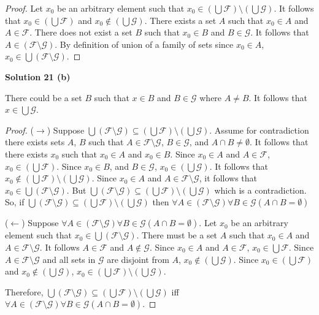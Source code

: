 \begin{proof}
    Let $x_0$ be an arbitrary element such that $x_0 \in (\bigcup \mathcal{F}) \setminus (\bigcup \mathcal{G})$.
    It follows that $x_0 \in (\bigcup \mathcal{F})$ and $x_0 \not \in (\bigcup \mathcal{G})$.
    There exists a set $A$ such that $x_0 \in A$ and $A \in \mathcal{F}$.
    There does not exist a set $B$ such that $x_0 \in B$ and $B \in \mathcal{G}$.
    It follows that $A \in (\mathcal{F} \setminus \mathcal{G})$.
    By definition of union of a family of sets since $x_0 \in A$, $x_0 \in \bigcup (\mathcal{F} \setminus \mathcal{G})$.
\end{proof}

\textbf{Solution 21 (b)}

There could be a set $B$ such that $x \in B$ and $B \in \mathcal{G}$ where $A
    \not = B$. It follows that $x \in \bigcup \mathcal{G}$.

\begin{proof}
    ($\rightarrow$) Suppose $\bigcup (\mathcal{F} \setminus \mathcal{G})
        \subseteq (\bigcup \mathcal{F}) \setminus (\bigcup \mathcal{G})$.
    Assume for contradiction there exists sets $A$, $B$ such that $A \in \mathcal{F} \setminus \mathcal{G}$, 
    $B \in \mathcal{G}$, and $A \cap B \not = \emptyset$.
    It follows that there exists $x_0$ such that $x_0 \in A$ and $x_0 \in B$.
    Since $x_0 \in A$ and $A \in \mathcal{F}$, $x_0 \in (\bigcup \mathcal{F})$.
    Since $x_0 \in B$, and $B \in \mathcal{G}$, $x_0 \in (\bigcup\mathcal{G})$.
    It follows that $x_0 \not \in (\bigcup \mathcal{F}) \setminus(\bigcup \mathcal{G})$.
    Since $x_0 \in A$ and $A \in \mathcal{F} \setminus \mathcal{G}$, 
    it follows that $x_0 \in \bigcup (\mathcal{F} \setminus \mathcal{G})$.
    But $\bigcup (\mathcal{F} \setminus \mathcal{G})
        \subseteq (\bigcup \mathcal{F}) \setminus (\bigcup \mathcal{G})$
    which is a contradiction.
    So, if $\bigcup (\mathcal{F} \setminus \mathcal{G})
        \subseteq (\bigcup \mathcal{F}) \setminus (\bigcup \mathcal{G})$
    then $\forall{A} \in (\mathcal{F} \setminus \mathcal{G})\forall{B}
        \in \mathcal{G}(A \cap B = \emptyset)$

    ($\leftarrow$) Suppose $\forall{A} \in (\mathcal{F} \setminus \mathcal{G})\forall{B} \in \mathcal{G}(A \cap B = \emptyset)$.
    Let $x_0$ be an arbitrary element such that $x_0 \in \bigcup (\mathcal{F} \setminus \mathcal{G})$.
    There must be a set $A$ such that $x_0 \in A$ and $A \in \mathcal{F} \setminus \mathcal{G}$.
    It follows $A \in \mathcal{F}$ and $A \not \in \mathcal{G}$.
    Since $x_0 \in A$ and $A \in \mathcal{F}$, $x_0 \in \bigcup \mathcal{F}$.
    Since $A \in \mathcal{F} \setminus \mathcal{G}$ and all sets in $\mathcal{G}$
    are disjoint from $A$, $x_0 \not \in (\bigcup \mathcal{G})$.
    Since $x_0 \in (\bigcup \mathcal{F})$ and $x_0 \not \in (\bigcup \mathcal{G})$,
    $x_0 \in (\bigcup \mathcal{F}) \setminus (\bigcup \mathcal{G})$.

    Therefore, $\bigcup (\mathcal{F} \setminus \mathcal{G}) \subseteq (\bigcup
        \mathcal{F}) \setminus (\bigcup \mathcal{G})$ iff $\forall{A} \in (\mathcal{F}
        \setminus \mathcal{G})\forall{B} \in \mathcal{G}(A \cap B = \emptyset)$.
\end{proof}

